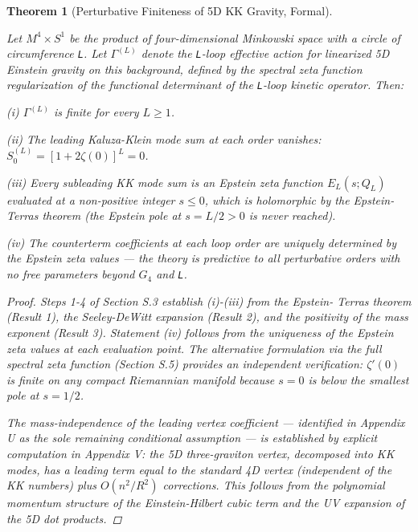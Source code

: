 \documentclass[aps,prd,preprint,superscriptaddress,longbibliography,floatfix]{revtex4-2}
\newtheorem{theorem}{Theorem}[section]
\theoremstyle{remark}
\begin{document}
\begin{theorem}[Perturbative Finiteness of 5D KK Gravity, Formal]
\label{thm:S1}

\textit{Let $M^{4} \times S^{1}$ be the product of four-dimensional Minkowski space with a circle of circumference \texttt{L}. Let $\Gamma^{(L)}$ denote the \texttt{L}-loop effective action for linearized 5D Einstein gravity on this background, defined by the spectral zeta function regularization of the functional determinant of the \texttt{L}-loop kinetic operator. Then:}

\textit{(i) $\Gamma^{(L)}$ is finite for every $L \geq 1$.}

\textit{(ii) The leading Kaluza-Klein mode sum at each order vanishes:} \textit{$S_{0}^{(L)} = [1 + 2\zeta(0)]^L = 0$.}

\textit{(iii) Every subleading KK mode sum is an Epstein zeta function $E_L(s; Q_L)$} \textit{evaluated at a non-positive integer $s \leq 0$, which is holomorphic by the} \textit{Epstein-Terras theorem (the Epstein pole at $s = L/2 > 0$ is never reached).}

\textit{(iv) The counterterm coefficients at each loop order are uniquely} \textit{determined by the Epstein zeta values --- the theory is predictive to all} \textit{perturbative orders with no free parameters beyond $G_{4}$ and \texttt{L}.}

\begin{proof} Steps 1-4 of Section S.3 establish (i)-(iii) from the Epstein- Terras theorem (Result 1), the Seeley-DeWitt expansion (Result 2), and the positivity of the mass exponent (Result 3). Statement (iv) follows from the uniqueness of the Epstein zeta values at each evaluation point. The alternative formulation via the full spectral zeta function (Section S.5) provides an independent verification: $\zeta'(0)$ is finite on any compact Riemannian manifold because $s = 0$ is below the smallest pole at $s = 1/2$.

The mass-independence of the leading vertex coefficient --- identified in Appendix U as the sole remaining conditional assumption --- is established by explicit computation in Appendix V: the 5D three-graviton vertex, decomposed into KK modes, has a leading term equal to the standard 4D vertex (independent of the KK numbers) plus $O(n^{2}/R^{2})$ corrections. This follows from the polynomial momentum structure of the Einstein-Hilbert cubic term and the UV expansion of the 5D dot products. \end{proof}
\end{theorem}
\end{document}
